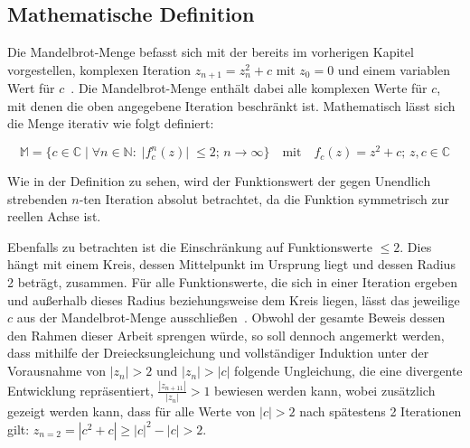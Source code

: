\subsection{Mathematische Definition}\label{subsec:mathematical-definition}

Die Mandelbrot-Menge befasst sich mit der bereits im vorherigen Kapitel vorgestellen,
komplexen Iteration \(z_{n+1} = z_n^2 + c \text{ mit } z_0 = 0\) und einem variablen
Wert für \(c\)~\cite*[S.25]{schuh_fraktale_2017}.
Die Mandelbrot-Menge enthält dabei alle komplexen Werte für $c$, mit denen die
oben angegebene Iteration beschränkt ist.
Mathematisch lässt sich die Menge iterativ wie folgt definiert:

\begin{equation}\label{eq:mathematical-definition}
  \mathbb{M} = \{c \in \mathbb{C} \; |\;  \forall n \in \mathbb{N}:\; |f_c^n(z)|\; \leqslant 2;\, n \to \infty\}
  \quad
  \text{mit}
  \quad
  f_c(z) = z^2 + c;\, z,c \in \mathbb{C}
\end{equation}

Wie in der Definition zu sehen, wird der Funktionswert der
gegen Unendlich strebenden $n$-ten Iteration absolut betrachtet, da die
Funktion symmetrisch zur reellen Achse ist.

Ebenfalls zu betrachten ist die Einschränkung auf Funktionswerte $\leqslant 2$.
Dies hängt mit einem Kreis, dessen Mittelpunkt im Ursprung liegt und dessen
Radius 2 beträgt, zusammen. %
Für alle Funktionswerte, die sich in einer Iteration ergeben und außerhalb dieses Radius
beziehungsweise dem Kreis liegen, lässt das jeweilige $c$ aus der Mandelbrot-Menge
ausschließen~\cite{munafo_escape_1997}.
Obwohl der gesamte Beweis dessen den Rahmen dieser Arbeit sprengen würde,
so soll dennoch angemerkt werden, dass mithilfe der Dreiecksungleichung und
vollständiger Induktion unter der Vorausnahme von $|z_n| > 2 \text{ und } |z_n| > |c|$
folgende Ungleichung, die eine divergente Entwicklung repräsentiert,
$\frac{|z_{n+11}|}{|z_n|} > 1$ bewiesen werden kann, wobei zusätzlich gezeigt
werden kann, dass für alle Werte von $|c| > 2$ nach spätestens 2 Iterationen gilt:
$z_{n=2} = |c^2 + c| \geqslant |c|^2 - |c| > 2$.